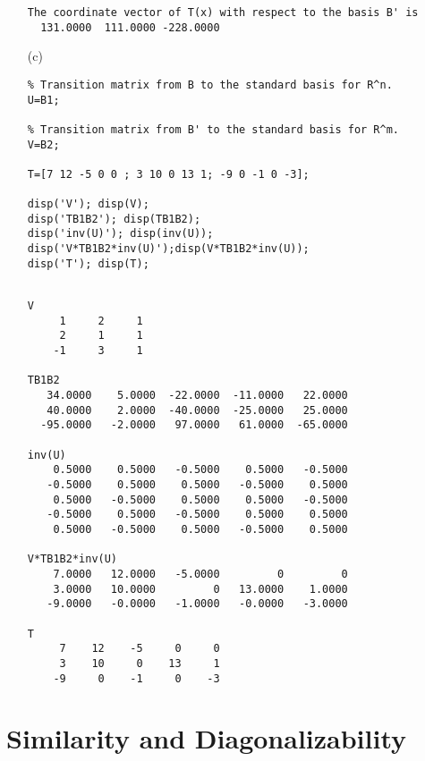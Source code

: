 \begin{sol}
\begin{enumerate}
\begin{outputs}
\begin{verbatim}
The coordinate vector of T(x) with respect to the basis B' is
  131.0000  111.0000 -228.0000
\end{verbatim}

\end{outputs}

\item[(c)]
\begin{verbatim}
% Transition matrix from B to the standard basis for R^n.
U=B1;

% Transition matrix from B' to the standard basis for R^m.
V=B2; 

T=[7 12 -5 0 0 ; 3 10 0 13 1; -9 0 -1 0 -3];

disp('V'); disp(V);
disp('TB1B2'); disp(TB1B2);
disp('inv(U)'); disp(inv(U));
disp('V*TB1B2*inv(U)');disp(V*TB1B2*inv(U));
disp('T'); disp(T);
\end{verbatim}


\begin{outputs}
\begin{verbatim}

V
     1     2     1
     2     1     1
    -1     3     1

TB1B2
   34.0000    5.0000  -22.0000  -11.0000   22.0000
   40.0000    2.0000  -40.0000  -25.0000   25.0000
  -95.0000   -2.0000   97.0000   61.0000  -65.0000

inv(U)
    0.5000    0.5000   -0.5000    0.5000   -0.5000
   -0.5000    0.5000    0.5000   -0.5000    0.5000
    0.5000   -0.5000    0.5000    0.5000   -0.5000
   -0.5000    0.5000   -0.5000    0.5000    0.5000
    0.5000   -0.5000    0.5000   -0.5000    0.5000

V*TB1B2*inv(U)
    7.0000   12.0000   -5.0000         0         0
    3.0000   10.0000         0   13.0000    1.0000
   -9.0000   -0.0000   -1.0000   -0.0000   -3.0000

T
     7    12    -5     0     0
     3    10     0    13     1
    -9     0    -1     0    -3
\end{verbatim}

\end{outputs}

\end{enumerate}
\end{sol}





\section{Similarity and Diagonalizability}


